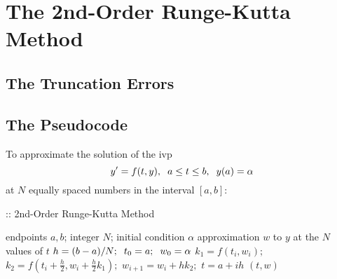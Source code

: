 \documentclass[12pt,oneside]{book}
\begin{document}
	\section{The 2nd-Order Runge-Kutta Method} \label{m:rk2}
		\begin{spacing}{1.2}
			
			
			
			\subsection*{The Truncation Errors}
			
			
			\subsection{The Pseudocode}
				To approximate the solution of the \ac{ivp} 
				\[ y' = f(t,y), \hspace*{0.2cm} a \leq t \leq b, \hspace*{0.2cm} y(a) = \alpha \]
				at $ N $ equally spaced numbers in the interval $ [a, b]: $
				
				\begin{algorithm}
					\caption{:: 2nd-Order Runge-Kutta Method}
					\begin{algorithmic}[1]
						\REQUIRE endpoints $ a, b $; \hspace*{0.2cm} integer $ N $; \hspace*{0.2cm} initial condition $ \alpha $
						\ENSURE approximation $ w $ to $ y $ at the $ N $ values of $ t $
						\STATE $ h = (b - a) / N; \hspace*{0.2cm} t_0 = a; \hspace*{0.2cm} w_{0} = \alpha $
							\STATE $ k_{1} = f(t_{i},w_{i}); $ \hspace*{0.5cm} 
							\STATE $ k_{2} = f\left(t_{i} + \frac{h}{2}, w_{i} + \frac{h}{2}k_{1}\right); $ \hspace*{0.5cm} 
							\STATE $ w_{i+1} = w_{i} + hk_{2}; $ \hspace*{0.5cm} 
							\STATE $ t = a + ih $ \hspace*{0.5cm} 
						\ENDFOR
						\RETURN $ (t, w) $
					\end{algorithmic}
				\end{algorithm}
			
		\end{spacing}
		
\end{document}
